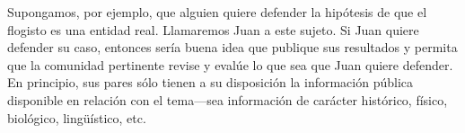 
Supongamos, por ejemplo, que alguien quiere defender la hipótesis de que el
flogisto es una entidad real. Llamaremos Juan a este sujeto. Si Juan quiere
defender su caso, entonces sería buena idea que publique sus resultados y
permita que la comunidad pertinente revise y evalúe lo que sea que Juan
quiere defender. En principio, sus pares sólo tienen a su disposición la información pública disponible en relación con el tema---sea información de carácter histórico, físico, biológico, lingüístico, etc.
